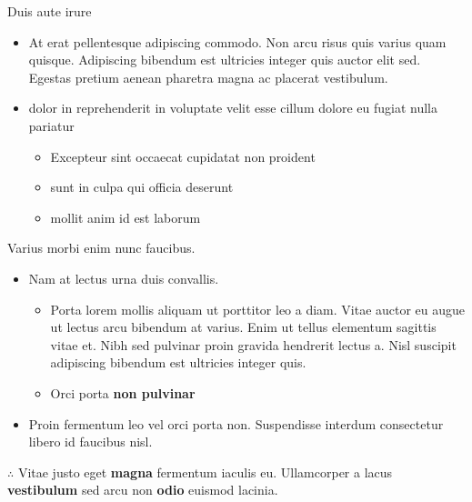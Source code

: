 \begin{frame}{Duis aute irure}
    \begin{itemize}
        \item At erat pellentesque adipiscing commodo\cite{gato_schroedingers_2011}. Non arcu risus quis varius quam quisque. Adipiscing bibendum est ultricies integer quis auctor elit sed\cite{mathieu_fun_2022}. Egestas pretium aenean pharetra magna ac placerat vestibulum. 
        \bigskip
        \item dolor in reprehenderit in voluptate velit esse cillum dolore eu fugiat nulla pariatur
        \begin{itemize}
            \item Excepteur sint occaecat cupidatat non proident
            \item sunt in culpa qui officia deserunt
            \item mollit anim id est laborum
        \end{itemize}
    \end{itemize}
\end{frame}


\begin{frame}{Varius morbi enim nunc faucibus.}
    \begin{itemize}
    \item Nam at lectus urna duis convallis.
    \begin{itemize}
        \item Porta lorem mollis aliquam ut porttitor leo a diam. Vitae auctor eu augue ut lectus arcu bibendum at varius. Enim ut tellus elementum sagittis vitae et\cite{polishchuk_gender-aware_2018}. Nibh sed pulvinar proin gravida hendrerit lectus a. Nisl suscipit adipiscing bibendum est ultricies integer quis.
        \item Orci porta \textbf{\alert{non pulvinar}}
    \end{itemize}
    \item Proin fermentum leo vel orci porta non. Suspendisse interdum consectetur libero id faucibus nisl. 
    \end{itemize}
    \bigskip
    $\therefore$ Vitae justo eget \textbf{magna} fermentum iaculis eu. Ullamcorper a lacus \textbf{vestibulum} sed arcu non \textbf{odio} euismod lacinia.
\end{frame}
